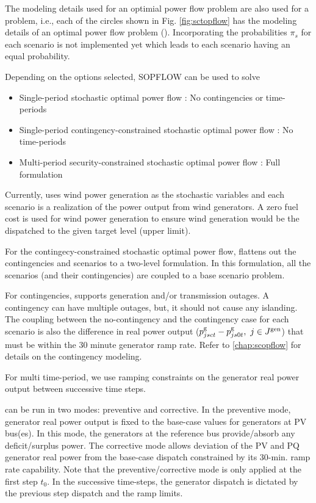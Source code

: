 The modeling details used for an optimial power flow problem are also used for a {\sopflow} problem, i.e., each of the circles shown in Fig. \ref{fig:sctopflow} has the modeling details of an optimal power flow problem (\opflow). Incorporating the probabilities $\pi_s$ for each scenario is not implemented yet which leads to each scenario having an equal probability. 

Depending on the options selected, SOPFLOW can be used to solve 
\begin{itemize}
    \item Single-period stochastic optimal power flow : No contingencies or time-periods
    \item Single-period contingency-constrained stochastic optimal power flow : No time-periods
    \item Multi-period security-constrained stochastic optimal power flow : Full formulation
\end{itemize}

Currently, \sopflow uses wind power generation as the stochastic variables and each scenario is a realization of the power output from wind generators. A zero fuel cost is used for wind power generation to ensure wind generation would be the dispatched to the given target level (upper limit). 

For the contingecy-constrained stochastic optimal power flow, \sopflow flattens out the contingencies and scenarios to a two-level formulation. In this formulation, all the scenarios (and their contingencies) are coupled to a base scenario problem.

For contingencies, \sopflow supports generation and/or transmission outages. A contingency can have multiple outages, but, it should not cause any islanding. The coupling between the no-contingency and the contingency case for each scenario is also the difference in real power output ($p_{jsct}^{\text{g}} - p_{js0t}^{\text{g}},~ j \in J^\mathrm{gen}$) that must be within the 30 minute generator ramp rate. Refer to \ref{chap:scopflow} for details on the contingency modeling.

For multi time-period, we use ramping constraints on the generator real power output between successive time steps.

\sopflow can be run in two modes: preventive and corrective. In the preventive mode, generator real power output is fixed to the base-case values for generators at PV bus(es). In this mode, the generators at the reference bus provide/absorb any deficit/surplus power. The corrective mode allows deviation of the PV and PQ generator real power from the base-case dispatch constrained by its 30-min. ramp rate capability. Note that the preventive/corrective mode is only applied at the first step $t_0$. In the successive time-steps, the generator dispatch is dictated by the previous step dispatch and the ramp limits.

